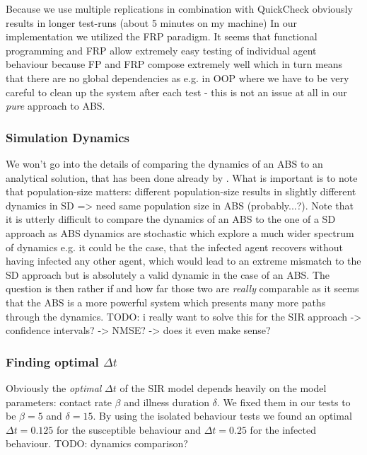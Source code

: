 Because we use multiple replications in combination with QuickCheck obviously results in longer test-runs (about 5 minutes on my machine)
In our implementation we utilized the FRP paradigm. It seems that functional programming and FRP allow extremely easy testing of individual agent behaviour because FP and FRP compose extremely well which in turn means that there are no global dependencies as e.g. in OOP where we have to be very careful to clean up the system after each test - this is not an issue at all in our \textit{pure} approach to ABS.

\subsubsection{Simulation Dynamics}
We won't go into the details of comparing the dynamics of an ABS to an analytical solution, that has been done already by \cite{macal_agent-based_2010}. What is important is to note that population-size matters: different population-size results in slightly different dynamics in SD => need same population size in ABS (probably...?). Note that it is utterly difficult to compare the dynamics of an ABS to the one of a SD approach as ABS dynamics are stochastic which explore a much wider spectrum of dynamics e.g. it could be the case, that the infected agent recovers without having infected any other agent, which would lead to an extreme mismatch to the SD approach but is absolutely a valid dynamic in the case of an ABS. The question is then rather if and how far those two are \textit{really} comparable as it seems that the ABS is a more powerful system which presents many more paths through the dynamics.
TODO: i really want to solve this for the SIR approach
	-> confidence intervals?
	-> NMSE?
	-> does it even make sense?

\subsubsection{Finding optimal $\Delta t$}
Obviously the \textit{optimal} $\Delta t$ of the SIR model depends heavily on the model parameters: contact rate $\beta$ and illness duration $\delta$. We fixed them in our tests to be $\beta = 5$ and $\delta = 15$. By using the isolated behaviour tests we found an optimal $\Delta t = 0.125$ for the susceptible behaviour and $\Delta t = 0.25$ for the infected behaviour. TODO: dynamics comparison?

